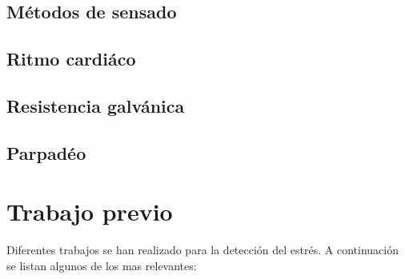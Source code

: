 \documentclass[letterpaper,12pt]{cicese}
\begin{document}
			\section{M\'etodos de sensado}
				\section{Ritmo cardiáco}
				\section{Resistencia galvánica}
				\section{Parpad\'eo}

		\chapter{Trabajo previo}
				Diferentes trabajos se han realizado para la detecci\'on del estr\'es. A continuaci\'on se listan algunos de los mas relevantes:
\end{document}
